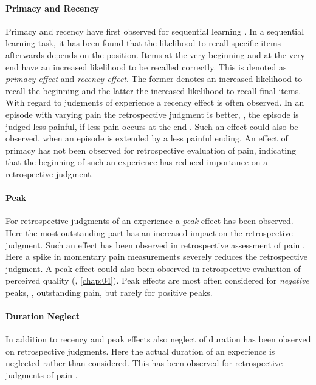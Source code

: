 \paragraph*{Primacy and Recency}
Primacy and recency have first observed for sequential learning \citep[\cf,][]{murdock_jr._serial_1962}.
In a sequential learning task, it has been found that the likelihood to recall specific items afterwards depends on the position.
Items at the very beginning and at the very end have an increased likelihood to be recalled correctly.
This is denoted as \emph{primacy effect} and \emph{recency effect}.
The former denotes an increased likelihood to recall the beginning and the latter the increased likelihood to recall final items.
With regard to judgments of experience a recency effect is often observed.
In an episode with varying pain the retrospective judgment is better, \ie, the episode is judged less painful, if less pain occurs at the end \citep[\cf,][]{kahneman_when_1993, redelmeier_patients_1996}.
Such an effect could also be observed, when an episode is extended by a less painful ending.
An effect of primacy has not been observed for retrospective evaluation of pain, indicating that the beginning of such an experience has reduced importance on a retrospective judgment.

\paragraph*{Peak}
For retrospective judgments of an experience a \emph{peak} effect has been observed.
Here the most outstanding part has an increased impact on the retrospective judgment.
Such an effect has been observed in retrospective assessment of pain \citep[\cf,][]{kahneman_when_1993, redelmeier_patients_1996}.
Here a spike in momentary pain measurements severely reduces the retrospective judgment.
A peak effect could also been observed in retrospective evaluation of perceived quality (\cf, \autoref{chap:04}).
Peak effects are most often considered for \emph{negative} peaks, \eg, outstanding pain, but rarely for positive peaks.

\paragraph*{Duration Neglect}
In addition to recency and peak effects also neglect of duration has been observed on retrospective judgments.
Here the actual duration of an experience is neglected rather than considered.
This has been observed for retrospective judgments of pain \citep[\cf,][]{fredrickson_duration_1993, ariely_combining_1998}.
